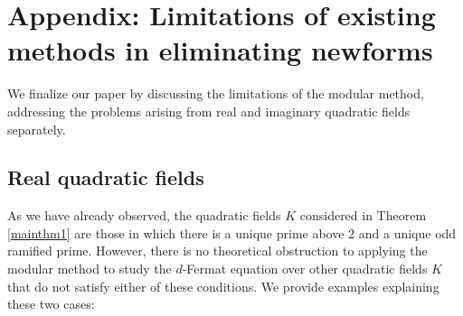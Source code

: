 \documentclass[]{article}
\newcounter{cases}
\begin{document}
\section{Appendix: Limitations of existing methods in eliminating newforms}

We finalize our paper by discussing the limitations of the modular method, addressing the problems arising from real and imaginary quadratic fields separately.

\subsection{Real quadratic fields}

As we have already observed, the quadratic fields $K$ considered in Theorem \ref{mainthm1} are those in which there is a unique prime above $2$ and a unique odd ramified prime. However, there is no theoretical obstruction to applying the modular method to study the $d$-Fermat equation over other quadratic fields $K$ that do not satisfy either of these conditions. We provide examples explaining these two cases:
\end{document}
